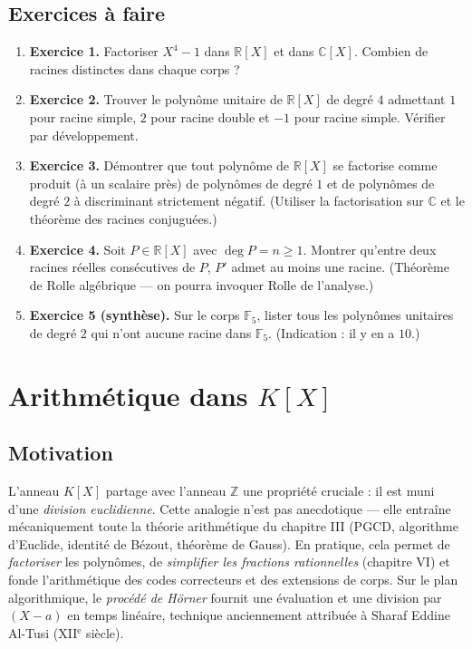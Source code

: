 \documentclass[12pt,a4paper]{report}
\theoremstyle{definition}
\theoremstyle{remark}
\begin{document}
\subsection{Exercices à faire}
\begin{enumerate}
    \item \textbf{Exercice 1.} Factoriser $X^4 - 1$ dans $\mathbb{R}[X]$ et dans $\mathbb{C}[X]$. Combien de racines distinctes dans chaque corps ?
    \item \textbf{Exercice 2.} Trouver le polynôme unitaire de $\mathbb{R}[X]$ de degré $4$ admettant $1$ pour racine simple, $2$ pour racine double et $-1$ pour racine simple. Vérifier par développement.
    \item \textbf{Exercice 3.} Démontrer que tout polynôme de $\mathbb{R}[X]$ se factorise comme produit (à un scalaire près) de polynômes de degré $1$ et de polynômes de degré $2$ à discriminant strictement négatif. (Utiliser la factorisation sur $\mathbb{C}$ et le théorème des racines conjuguées.)
    \item \textbf{Exercice 4.} Soit $P \in \mathbb{R}[X]$ avec $\deg P = n \ge 1$. Montrer qu'entre deux racines réelles consécutives de $P$, $P'$ admet au moins une racine. (Théorème de Rolle algébrique --- on pourra invoquer Rolle de l'analyse.)
    \item \textbf{Exercice 5 (synthèse).} Sur le corps $\mathbb{F}_5$, lister tous les polynômes unitaires de degré $2$ qui n'ont aucune racine dans $\mathbb{F}_5$. (Indication : il y en a $10$.)
\end{enumerate}

\section{Arithmétique dans $K[X]$}

\subsection{Motivation}
L'anneau $K[X]$ partage avec l'anneau $\mathbb{Z}$ une propriété cruciale : il est muni d'une \emph{division euclidienne}. Cette analogie n'est pas anecdotique --- elle entraîne mécaniquement toute la théorie arithmétique du chapitre III (PGCD, algorithme d'Euclide, identité de Bézout, théorème de Gauss). En pratique, cela permet de \emph{factoriser} les polynômes, de \emph{simplifier les fractions rationnelles} (chapitre VI) et fonde l'arithmétique des codes correcteurs et des extensions de corps. Sur le plan algorithmique, le \emph{procédé de Hörner} fournit une évaluation et une division par $(X - a)$ en temps linéaire, technique anciennement attribuée à Sharaf Eddine Al-Tusi (XII$^{\text{e}}$ siècle).
\end{document}

